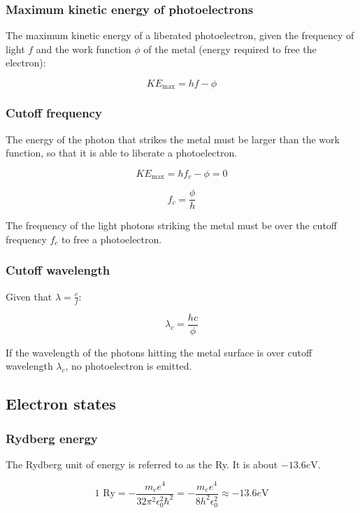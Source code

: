 \documentclass[12pt]{article}
\begin{document}
\subsubsection{Maximum kinetic energy of photoelectrons}

The maximum kinetic energy of a liberated photoelectron, given the frequency of light $f$ and the work function $\phi$ of the metal (energy required to free the electron):

\[
\boxed{
KE_{\text{max}} = hf - \phi
}
\]

\subsubsection{Cutoff frequency}

The energy of the photon that strikes the metal must be larger than the work function, so that it is able to liberate a photoelectron.

\[
KE_{\text{max}} = hf_c - \phi = 0
\]

\[
\boxed{
f_c = \frac{\phi}{h}
}
\]

The frequency of the light photons striking the metal must be over the cutoff frequency $f_c$ to free a photoelectron.

\subsubsection{Cutoff wavelength}

Given that $\lambda = \frac{c}{f}$:

\[
\boxed{
\lambda_c = \frac{hc}{\phi}
}
\]

If the wavelength of the photons hitting the metal surface is over cutoff wavelength $\lambda_c$, no photoelectron is emitted.

\newpage

\subsection{Electron states}

\subsubsection{Rydberg energy}

The Rydberg unit of energy is referred to as the Ry. It is about $-13.6 e\text{V}$.

\[
\boxed{
1 \text{ Ry} = -\frac{m_e e^4}{32\pi^2\epsilon_0^2\hbar^2} = -\frac{m_e e^4}{8h^2 \epsilon_0^2} \approx -13.6 e\text{V}
}
\]
\end{document}
